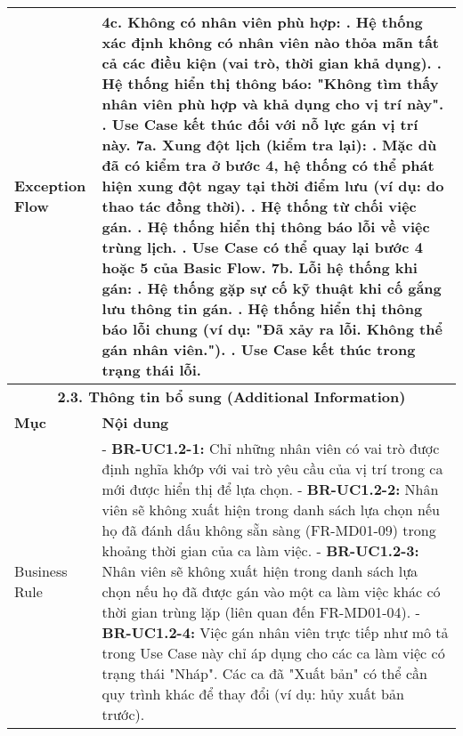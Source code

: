 \begin{longtable}{|m{4cm}|p{11cm}|}
\hline
Exception Flow & \textbf{4c. Không có nhân viên phù hợp:} \newline    1. Hệ thống xác định không có nhân viên nào thỏa mãn tất cả các điều kiện (vai trò, thời gian khả dụng). \newline    2. Hệ thống hiển thị thông báo: "Không tìm thấy nhân viên phù hợp và khả dụng cho vị trí này". \newline    3. Use Case kết thúc đối với nỗ lực gán vị trí này. \newline \textbf{7a. Xung đột lịch (kiểm tra lại):} \newline    1. Mặc dù đã có kiểm tra ở bước 4, hệ thống có thể phát hiện xung đột ngay tại thời điểm lưu (ví dụ: do thao tác đồng thời). \newline    2. Hệ thống từ chối việc gán. \newline    3. Hệ thống hiển thị thông báo lỗi về việc trùng lịch. \newline    4. Use Case có thể quay lại bước 4 hoặc 5 của Basic Flow. \newline \textbf{7b. Lỗi hệ thống khi gán:} \newline    1. Hệ thống gặp sự cố kỹ thuật khi cố gắng lưu thông tin gán. \newline    2. Hệ thống hiển thị thông báo lỗi chung (ví dụ: "Đã xảy ra lỗi. Không thể gán nhân viên."). \newline    3. Use Case kết thúc trong trạng thái lỗi. \\
\hline
\multicolumn{2}{|c|}{\textbf{2.3. Thông tin bổ sung (Additional Information)}} \\
\hline
\textbf{Mục} & \textbf{Nội dung} \\
\hline
Business Rule & - \textbf{BR-UC1.2-1:} Chỉ những nhân viên có vai trò được định nghĩa khớp với vai trò yêu cầu của vị trí trong ca mới được hiển thị để lựa chọn. \newline - \textbf{BR-UC1.2-2:} Nhân viên sẽ không xuất hiện trong danh sách lựa chọn nếu họ đã đánh dấu không sẵn sàng (FR-MD01-09) trong khoảng thời gian của ca làm việc. \newline - \textbf{BR-UC1.2-3:} Nhân viên sẽ không xuất hiện trong danh sách lựa chọn nếu họ đã được gán vào một ca làm việc khác có thời gian trùng lặp (liên quan đến FR-MD01-04). \newline - \textbf{BR-UC1.2-4:} Việc gán nhân viên trực tiếp như mô tả trong Use Case này chỉ áp dụng cho các ca làm việc có trạng thái "Nháp". Các ca đã "Xuất bản" có thể cần quy trình khác để thay đổi (ví dụ: hủy xuất bản trước). \\

\end{longtable}

